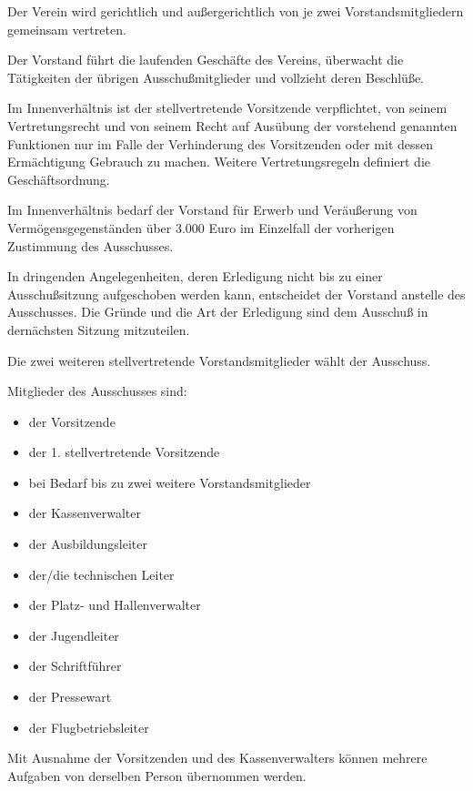\documentclass[10pt,a4paper,parskip=half]{scrartcl}
\begin{document}
\begin{contract}
\begin{multicols}{2}
\begin{enumerate}[label=\alph*),noitemsep]
    Der Verein wird gerichtlich und außergerichtlich von je zwei Vorstandsmitgliedern gemeinsam vertreten.
    
    Der Vorstand führt die laufenden Geschäfte des Vereins, überwacht die Tätigkeiten der übrigen Ausschußmitglieder und vollzieht deren Beschlüße.
    
    Im Innenverhältnis ist der stellvertretende Vorsitzende verpflichtet,
    von seinem Vertretungsrecht und von seinem Recht auf Ausübung der vorstehend genannten Funktionen nur im Falle der Verhinderung des Vorsitzenden oder mit dessen Ermächtigung Gebrauch zu machen. Weitere Vertretungsregeln definiert die Geschäftsordnung.
    
    Im Innenverhältnis bedarf der Vorstand für Erwerb und Veräußerung von Vermögensgegenständen über 3.000 Euro im Einzelfall der vorherigen Zustimmung des Ausschusses.
    
    In dringenden Angelegenheiten,
    deren Erledigung nicht bis zu einer Ausschußsitzung aufgeschoben werden kann,
    entscheidet der Vorstand anstelle des Ausschusses.
    Die Gründe und die Art der Erledigung sind dem Ausschuß in dernächsten Sitzung mitzuteilen.

    Die zwei weiteren stellvertretende Vorstandsmitglieder wählt der Ausschuss.
    
    \label{C:Ausschuss}
    Mitglieder des Ausschusses sind:
    \begin{itemize}[noitemsep]
      \item der Vorsitzende
      \item der 1. stellvertretende Vorsitzende
      \item bei Bedarf bis zu zwei weitere Vorstandsmitglieder
      \item der Kassenverwalter
      \item der Ausbildungsleiter
      \item der/die technischen Leiter
      \item der Platz- und Hallenverwalter
      \item der Jugendleiter
      \item der Schriftführer
      \item der Pressewart
      \item der Flugbetriebsleiter
    \end{itemize}
    Mit Ausnahme der Vorsitzenden und des Kassenverwalters können mehrere Aufgaben von derselben Person übernommen werden.
    

\end{enumerate}
\end{multicols}
\end{contract}
\end{document}
